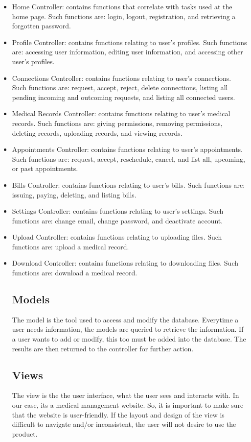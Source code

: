 \documentclass[12pt]{report}
\begin{document}
\begin{itemize} 
\item Home Controller: contains functions that correlate with tasks used at the home page.
Such functions are: login, logout, registration, and retrieving a forgotten password. 
\item Profile Controller: contains functions relating to user's profiles.
Such functions are: accessing user information, editing user information, and accessing other user's profiles.
\item Connections Controller: contains functions relating to user's connections.
Such functions are: request, accept, reject, delete connections, listing all pending incoming and outcoming requests, and listing all connected users.
\item Medical Records Controller: contains functions relating to user's medical records.
Such functions are: giving permissions, removing permissions, deleting records, uploading records, and viewing records. 
\item Appointments Controller: contains functions relating to user's appointments.
Such functions are: request, accept, reschedule, cancel, and list all, upcoming, or past appointments.
\item Bills Controller: contains functions relating to user's bills.
Such functions are: issuing, paying, deleting, and listing bills. 
\item Settings Controller: contains functions relating to user's settings.
Such functions are: change email, change password, and deactivate account.
\item Upload Controller: contains functions relating to uploading files.
Such functions are: upload a medical record.
\item Download Controller: contains functions relating to downloading files.
Such functions are: download a medical record.

\subsection{Models}
The model is the tool used to access and modify the database. Everytime a user needs information, the models are queried to retrieve the information. If a user wants to add or modify, this too must be added into the database. The results are then returned to the controller for further action.

\subsection{Views}
The view is the the user interface, what the user sees and interacts with. In our case, its a medical management website. So, it is important to make sure that the website is user-friendly. If the layout and design of the view is difficult to navigate and/or inconsistent, the user will not desire to use the product. 


\end{itemize}
\end{document}
